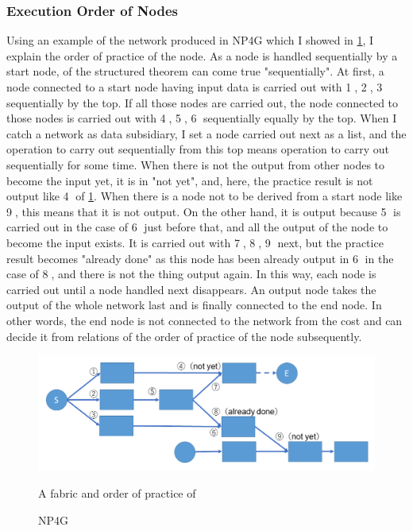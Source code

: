 \documentclass{article}
\begin{document}
\subsubsection {Execution Order of Nodes}
\label{sec:sequence}
Using an example of the network produced in NP4G which I showed in \ref{fig:sequence}, I explain the order of practice of the node.
As a node is handled sequentially by a start node, of the structured theorem can come true "sequentially".
At first, a node connected to a start node having input data is carried out with \textcircled{\scriptsize 1}, \textcircled{\scriptsize 2}, \textcircled{\scriptsize 3} sequentially by the top.
If all those nodes are carried out, the node connected to those nodes is carried out with \textcircled{\scriptsize 4}, \textcircled{\scriptsize 5}, \textcircled{\scriptsize 6} sequentially equally by the top.
When I catch a network as data subsidiary, I set a node carried out next as a list, and the operation to carry out sequentially from this top means operation to carry out sequentially for some time.
When there is not the output from other nodes to become the input yet, it is in "not yet", and, here, the practice result is not output like \textcircled{\scriptsize 4} of \ref{fig:sequence}.
When there is a node not to be derived from a start node like \textcircled{\scriptsize 9}, this means that it is not output.
On the other hand, it is output because \textcircled{\scriptsize 5} is carried out in the case of \textcircled{\scriptsize 6} just before that, and all the output of the node to become the input exists.
It is carried out with \textcircled{\scriptsize 7}, \textcircled{\scriptsize 8}, \textcircled{\scriptsize 9} next, but the practice result becomes "already done" as this node has been already output in \textcircled{\scriptsize 6} in the case of \textcircled{\scriptsize 8}, and there is not the thing output again.
In this way, each node is carried out until a node handled next disappears.
An output node takes the output of the whole network last and is finally connected to the end node.
In other words, the end node is not connected to the network from the cost and can decide it from relations of the order of practice of the node subsequently.
\begin{figure}[t]
\begin{center}
\includegraphics[width=130mm]{sequence.png}
\end{center}
A fabric and order of practice of \caption{NP4G}
\label{fig:sequence}
\end{figure}
\end{document}
